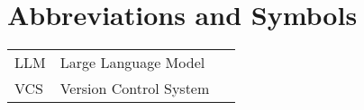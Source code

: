\chapter*{Abbreviations and Symbols}

\begin{flushleft}
\begin{tabular}{l p{0.8\linewidth}}
LLM      & Large Language Model\\
VCS     & Version Control System\\
\end{tabular}
\end{flushleft}

